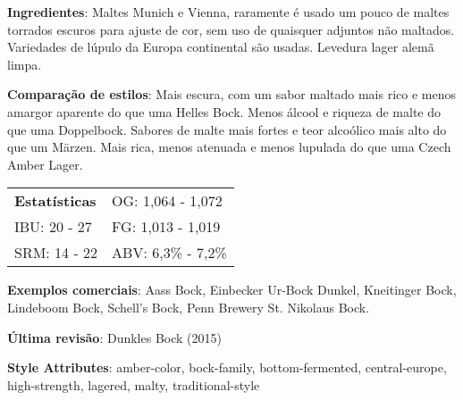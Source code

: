\textbf{Ingredientes}: Maltes Munich e Vienna, raramente é usado um pouco de maltes torrados escuros para ajuste de cor, sem uso de quaisquer adjuntos não maltados. Variedades de lúpulo da Europa continental são usadas. Levedura lager alemã limpa.

\textbf{Comparação de estilos}: Mais escura, com um sabor maltado mais rico e menos amargor aparente do que uma Helles Bock. Menos álcool e riqueza de malte do que uma Doppelbock. Sabores de malte mais fortes e teor alcoólico mais alto do que um Märzen. Mais rica, menos atenuada e menos lupulada do que uma Czech Amber Lager.

\begin{tabular}{@{}p{35mm}p{35mm}@{}}
  \textbf{Estatísticas} & OG: 1,064 - 1,072 \\
  IBU: 20 - 27 & FG: 1,013 - 1,019 \\
  SRM: 14 - 22 & ABV: 6,3\% - 7,2\%
\end{tabular}

\textbf{Exemplos comerciais}: Aass Bock, Einbecker Ur-Bock Dunkel, Kneitinger Bock, Lindeboom Bock, Schell’s Bock, Penn Brewery St. Nikolaus Bock.

\textbf{Última revisão}: Dunkles Bock (2015)

\textbf{Style Attributes}: amber-color, bock-family, bottom-fermented, central-europe, high-strength, lagered, malty, traditional-style

